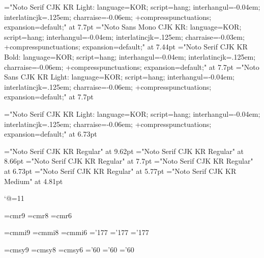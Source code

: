 \sethangulfont\eightmj="Noto Serif CJK KR Light:%
  language=KOR;%
  script=hang;%
  interhangul=-0.04em;%
  interlatincjk=.125em;%
  charraise=-0.06em;%
  +compresspunctuations;%
  expansion=default;" at 7.7pt
\sethangulfont\eighttz="Noto Sans Mono CJK KR:%
  language=KOR;%
  script=hang;%
  interhangul=-0.04em;%
  interlatincjk=.125em;%
  charraise=-0.03em;%
  +compresspunctuations;%
  expansion=default;" at 7.44pt
\sethangulfont\eightbd="Noto Serif CJK KR Bold:%
  language=KOR;%
  script=hang;%
  interhangul=-0.04em;%
  interlatincjk=.125em;%
  charraise=-0.06em;%
  +compresspunctuations;%
  expansion=default;" at 7.7pt
\sethangulfont\eightgt="Noto Sans CJK KR Light:%
  language=KOR;%
  script=hang;%
  interhangul=-0.04em;%
  interlatincjk=.125em;%
  charraise=-0.06em;%
  +compresspunctuations;%
  expansion=default;" at 7.7pt

\sethangulfont\sevenmj="Noto Serif CJK KR Light:%
  language=KOR;%
  script=hang;%
  interhangul=-0.04em;%
  interlatincjk=.125em;%
  charraise=-0.06em;%
  +compresspunctuations;%
  expansion=default;" at 6.73pt

\font\texthangul="Noto Serif CJK KR Regular" at 9.62pt
\font\texthangulnine="Noto Serif CJK KR Regular" at 8.66pt
\font\texthanguleight="Noto Serif CJK KR Regular" at 7.7pt
\font\scripthangul="Noto Serif CJK KR Regular" at 6.73pt
\font\scripthangulsix="Noto Serif CJK KR Regular" at 5.77pt
\font\scriptscripthangul="Noto Serif CJK KR Medium" at 4.81pt

\catcode`@=11 %

\font\ninermfont=cmr9
\font\eightrmfont=cmr8
\font\sixrm=cmr6

\font\ninei=cmmi9
\font\eighti=cmmi8
\font\sixi=cmmi6
\skewchar\ninei='177 \skewchar\eighti='177 \skewchar\sixi='177

\font\ninesy=cmsy9
\font\eightsy=cmsy8
\font\sixsy=cmsy6
\skewchar\ninesy='60 \skewchar\eightsy='60 \skewchar\sixsy='60

